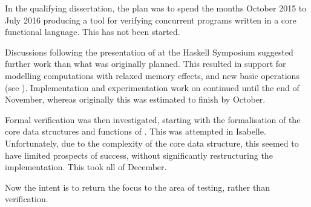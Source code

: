 In the qualifying dissertation, the plan was to spend the months
October 2015 to July 2016 producing a tool for verifying concurrent
programs written in a core functional language. This has not been
started.

Discussions following the presentation of \dejafu{} at the Haskell
Symposium suggested further work than what was originally
planned. This resulted in support for modelling computations with
relaxed memory effects, and new basic operations (see
). Implementation and experimentation work on
\dejafu{} continued until the end of November, whereas originally this
was estimated to finish by October.

Formal verification was then investigated, starting with the
formalisation of the core data structures and functions of
\dejafu{}. This was attempted in Isabelle. Unfortunately, due to the
complexity of the core data structure, this seemed to have limited
prospects of success, without significantly restructuring the
implementation. This took all of December.

Now the intent is to return the focus to the area of testing, rather
than verification.
